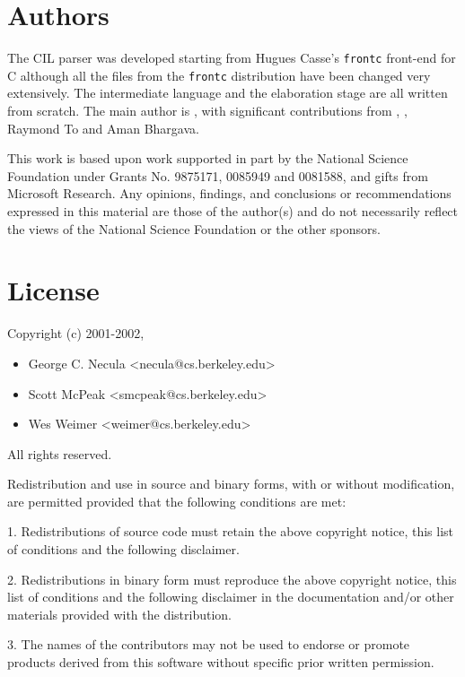 \documentclass{article}
\def\t#1{{\tt #1}}
\begin{document}
\section{Authors}

 The CIL parser was developed starting from Hugues Casse's \t{frontc}
front-end for C although all the files from the \t{frontc} distribution have
been changed very extensively. The intermediate language and the elaboration
stage are all written from scratch. The main author is
, with significant
contributions from ,
, Raymond To and Aman
Bhargava.

 This work is based upon work supported in part by the National Science
Foundation under Grants No. 9875171, 0085949 and 0081588, and gifts from
Microsoft Research. Any opinions, findings, and conclusions or recommendations
expressed in this material are those of the author(s) and do not necessarily
reflect the views of the National Science Foundation or the other sponsors.

\section{License}

Copyright (c) 2001-2002, 
\begin{itemize}
\item George C. Necula    <necula@cs.berkeley.edu>
\item Scott McPeak        <smcpeak@cs.berkeley.edu>
\item Wes Weimer          <weimer@cs.berkeley.edu>
\end{itemize}
All rights reserved.

Redistribution and use in source and binary forms, with or without
modification, are permitted provided that the following conditions are met:

1. Redistributions of source code must retain the above copyright notice,
this list of conditions and the following disclaimer.

2. Redistributions in binary form must reproduce the above copyright notice,
this list of conditions and the following disclaimer in the documentation
and/or other materials provided with the distribution.

3. The names of the contributors may not be used to endorse or promote
products derived from this software without specific prior written
permission.
\end{document}
